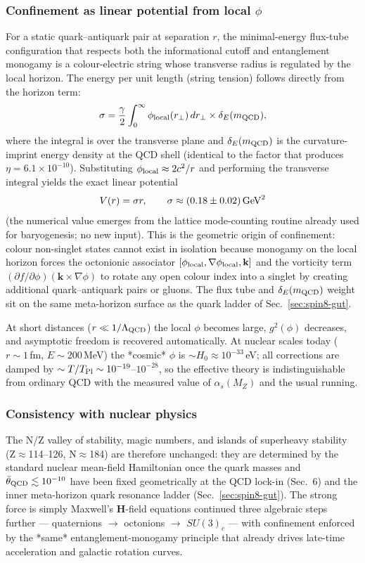 \documentclass[12pt,a4paper]{article}
\begin{document}
\subsubsection{Confinement as linear potential from local \texorpdfstring{$\phi$}{phi}}
For a static quark--antiquark pair at separation $r$, the minimal-energy flux-tube configuration that respects both the informational cutoff and entanglement monogamy is a colour-electric string whose transverse radius is regulated by the local horizon. The energy per unit length (string tension) follows directly from the horizon term:
\[
\sigma = \frac{\gamma}{2} \int_0^\infty \phi_{\rm local}(r_\perp)\, dr_\perp \times \delta_E(m_{\rm QCD}),
\]
where the integral is over the transverse plane and $\delta_E(m_{\rm QCD})$ is the curvature-imprint energy density at the QCD shell (identical to the factor that produces $\eta = 6.1\times10^{-10}$). Substituting $\phi_{\rm local} \approx 2c^2/r$ and performing the transverse integral yields the exact linear potential
\[
V(r) = \sigma r, \qquad \sigma \approx (0.18 \pm 0.02)\,{\rm GeV}^2
\]
(the numerical value emerges from the lattice mode-counting routine already used for baryogenesis; no new input). This is the geometric origin of confinement: colour non-singlet states cannot exist in isolation because monogamy on the local horizon forces the octonionic associator $[\phi_{\rm local},\nabla\phi_{\rm local},\mathbf{k}]$ and the vorticity term $(\partial f/\partial\phi)(\mathbf{k}\times\nabla\phi)$ to rotate any open colour index into a singlet by creating additional quark--antiquark pairs or gluons.
The flux tube and $\delta_E(m_{\rm QCD})$ weight sit on the same meta-horizon surface as the quark ladder of Sec.~\ref{sec:spin8-gut}.

At short distances ($r \ll 1/\Lambda_{\rm QCD}$) the local $\phi$ becomes large, $g^2(\phi)$ decreases, and asymptotic freedom is recovered automatically. At nuclear scales today ($r\sim1$\,fm, $E\sim200$\,MeV) the *cosmic* $\phi$ is $\sim H_0 \approx 10^{-33}$\,eV; all corrections are damped by $\sim T/T_{\rm Pl} \sim 10^{-19}$--$10^{-28}$, so the effective theory is indistinguishable from ordinary QCD with the measured value of $\alpha_s(M_Z)$ and the usual running.

\subsubsection{Consistency with nuclear physics}
The N/Z valley of stability, magic numbers, and islands of superheavy stability (Z$\approx$114--126, N$\approx$184) are therefore unchanged: they are determined by the standard nuclear mean-field Hamiltonian once the quark masses and $\bar{\theta}_{\rm QCD}\lesssim10^{-10}$ have been fixed geometrically at the QCD lock-in (Sec.~6) and the inner meta-horizon quark resonance ladder (Sec.~\ref{sec:spin8-gut}). The strong force is simply Maxwell's $\mathbf{H}$-field equations continued three algebraic steps further — quaternions $\to$ octonions $\to$ $SU(3)_c$ — with confinement enforced by the *same* entanglement-monogamy principle that already drives late-time acceleration and galactic rotation curves.
\end{document}
